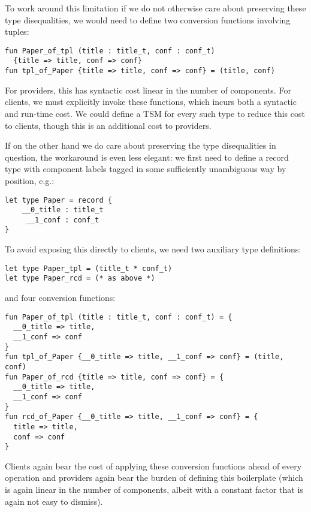 To work around this limitation if we do not otherwise care about preserving these type disequalities, we would need to define two conversion functions involving tuples:
\begin{lstlisting}[numbers=none]
fun Paper_of_tpl (title : title_t, conf : conf_t)
  {title => title, conf => conf}
fun tpl_of_Paper {title => title, conf => conf} = (title, conf)
\end{lstlisting}
For providers, this has syntactic cost linear in the number of components. For clients, we must explicitly invoke these functions, which incurs both a syntactic and run-time cost. We could define a TSM for every such type to reduce this cost to clients, though this is an additional cost to providers.%

If on the other hand we do care about preserving the type disequalities in question, the workaround is even less elegant: we first need to define a record type with component labels tagged in some sufficiently unambiguous way by position, e.g.:
\begin{lstlisting}[numbers=none]
let type Paper = record {
	__0_title : title_t
	 __1_conf : conf_t 
}\end{lstlisting}
To avoid exposing this directly to clients, we need two auxiliary type definitions:
\begin{lstlisting}[numbers=none]
let type Paper_tpl = (title_t * conf_t)
let type Paper_rcd = (* as above *)
\end{lstlisting}
and four conversion functions:
\begin{lstlisting}[numbers=none]
fun Paper_of_tpl (title : title_t, conf : conf_t) = {
  __0_title => title,
  __1_conf => conf
}
fun tpl_of_Paper {__0_title => title, __1_conf => conf} = (title, conf)
fun Paper_of_rcd {title => title, conf => conf} = {
  __0_title => title,
  __1_conf => conf
}
fun rcd_of_Paper {__0_title => title, __1_conf => conf} = {
  title => title,
  conf => conf
}
\end{lstlisting}
Clients again bear the cost of applying these conversion functions ahead of every operation and providers again bear the burden of defining this boilerplate (which is again linear in the number of components, albeit with a constant factor that is again not easy to dismiss). %

